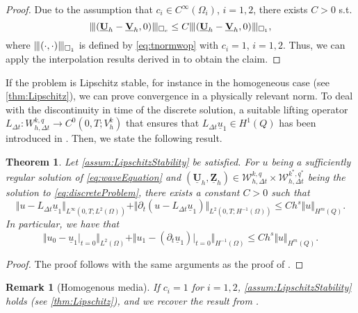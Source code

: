 \documentclass[sn-mathphys-num]{sn-jnl}
\newtheorem{thm}{Theorem}[section]
\newtheorem{rmk}{Remark}
\numberwithin{equation}{section}
\newcommand{\wop}{\square_c}
\newcommand{\tnorm}[1]{\vert\hspace{-0.3mm}\Vert#1\Vert\hspace{-0.3mm}\vert}
\newcommand{\FullyDiscrSpace}[2]{ W^{ {#1},{#2}}_{h, \Delta t  } }
\newcommand{\ProdFullyDiscrSpace}[2]{ \mathcal{W}^{ {#1},{#2}}_{h, \Delta t  } }
\newcommand{\Uh}{\underline{\mathbf{U}}_h}
\newcommand{\Vh}{\underline{\mathbf{V}}_h}
\newcommand{\Zh}{\underline{\mathbf{Z}}_h}
\newcommand{\ul}{\underline{u}}
\newcommand{\dt}{\partial_t}
\begin{document}
\begin{proof}
    Due to the assumption that $c_i \in C^\infty(\Omega_i)$, $i = 1,2$, there exists $C > 0$ s.t.  
    \begin{equation*}
        \tnorm{(\Uh - \Vh, 0)}_{\wop} \le C \tnorm{(\Uh - \Vh, 0)}_{\square_1},
    \end{equation*}
    where $\tnorm{(\cdot, \cdot)}_{\square_1}$ is defined by \eqref{eq:tnormwop} with $c_i = 1$, $i = 1,2$. Thus, we can apply the interpolation results derived in \cite[Lemma 5]{BP24} to obtain the claim. 
\end{proof}


If the problem is Lipschitz stable, for instance in the homogeneous case (see \cref{thm:Lipschitz}), we can prove convergence in a physically relevant norm. To deal with the discontinuity in time of the discrete solution, a suitable lifting operator$L_{\Delta t} : \FullyDiscrSpace{k}{q} \rightarrow C^0(0,T;V_h^k)$ that ensures that $L_{\Delta t} \ul_1 \in H^1(Q)$ has been introduced in \cite[Sec. 4]{BP24}. Then, we state the following result.

\begin{thm}\label{thm:convergence}
    Let \cref{assum:LipschitzStability} be satisfied. For $u$ being a sufficiently regular solution of \eqref{eq:waveEquation} and $(\Uh,\Zh) \in \ProdFullyDiscrSpace{k}{q} \times \ProdFullyDiscrSpace{k^\ast}{q^\ast}$ being the solution to \eqref{eq:discreteProblem}, there exists a constant $C>0$ such that
    \begin{equation}
        \Vert u - L_{\Delta t} \ul_1 \Vert_{L^\infty(0,T;L^2(\Omega))} + \Vert \dt (u - L_{\Delta t} \ul_1) \Vert_{L^2(0,T;H^{-1}(\Omega))} \le C h^s \Vert u \Vert_{H^m(Q)}. 
    \end{equation}
    In particular, we have that 
    \begin{equation}
        \Vert u_0 - \ul_1 \vert_{t = 0} \Vert_{L^2(\Omega)} + \Vert u_1 - (\dt \ul_1) \vert_{t = 0} \Vert_{H^{-1}(\Omega)} \le C h^s \Vert u \Vert_{H^m(Q)}.
    \end{equation}
\end{thm}

\begin{proof}
    The proof follows with the same arguments as the proof of \cite[Theorem 10]{BP24}.
\end{proof}


\begin{rmk}[Homogenous media]\label{rem:homMedia}
    If $c_i = 1$ for $i = 1,2$, \cref{assum:LipschitzStability} holds (see \cref{thm:Lipschitz}), and we recover the result from \cite[Theorem 10]{BP24}.
\end{rmk}
\end{document}
